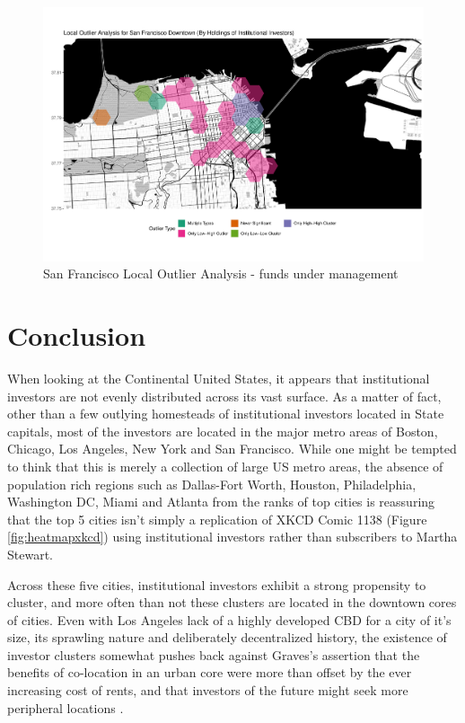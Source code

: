 \begin{figure}
	\centering
	\includegraphics[width=1\linewidth]{Figures/ChapterIV/SF_Money_LO_Downtown}
	\caption[Downtown San Francisco Local Outlier Analysis - Funds Under Management 2013-2018]{San Francisco Local Outlier Analysis - funds under management}
	\label{fig:SFlocaloutlier_Downtown}
\end{figure}
\section{Conclusion}	


When looking at the Continental United States, it appears that institutional investors are not evenly distributed across its vast surface.  As a matter of fact, other than a few outlying homesteads of institutional investors located in State capitals, most of the investors are located in the major metro areas of Boston, Chicago, Los Angeles, New York and San Francisco.  While one might be tempted to think that this is merely a collection of large US metro areas, the absence of population rich regions such as Dallas-Fort Worth, Houston, Philadelphia, Washington DC, Miami and Atlanta from the ranks of top cities is reassuring that the top 5 cities isn't simply a replication of XKCD Comic 1138 (Figure \ref{fig:heatmapxkcd}) using institutional investors rather than subscribers to Martha Stewart. 

Across these five cities, institutional investors exhibit a strong propensity to cluster, and more often than not these clusters are located in the downtown cores of cities.  Even with Los Angeles lack of a highly developed CBD for a city of it's size, its sprawling nature and deliberately decentralized history, the  existence of investor clusters somewhat pushes back against Graves's assertion that the benefits of co-location in an urban core were more than offset by the ever increasing cost of rents, and that investors of the future might seek more peripheral locations \citep{Graves2003}.   

